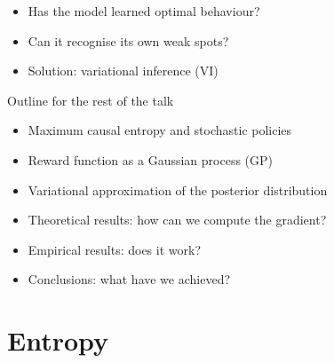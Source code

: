 \documentclass{beamer}
\begin{document}
\begin{frame}
  \begin{itemize}
  \item Has the model learned optimal behaviour?
  \item Can it recognise its own weak spots?
  \item Solution: variational inference (VI)
  \end{itemize}
  \pause
  \begin{block}{Outline for the rest of the talk}
  \begin{itemize}
  \item Maximum causal entropy and stochastic policies
  \item Reward function as a Gaussian process (GP)
  \item Variational approximation of the posterior distribution
  \item Theoretical results: how can we compute the gradient?
  \item Empirical results: does it work?
  \item Conclusions: what have we achieved?
  \end{itemize}
  \end{block}
\end{frame}

\section{Entropy}
\end{document}
